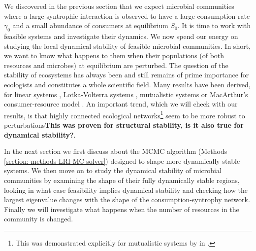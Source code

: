 \documentclass[12pt, titlepage]{report}
\begin{document}
We discovered in the previous section that we expect microbial communities where a large syntrophic interaction is observed to have a large consumption rate $\gamma_0$ and a small abundance of consumers at equilibrium $S_0$. It is time to work with feasible systems and investigate their dynamics. We now spend our energy on studying the local dynamical stability of feasible microbial communities. In short, we want to know what happens to them when their populations (of both resources and microbes) at equilibrium are perturbed. The question of the stability of ecosystems has always been and still remains of prime importance for ecologists and constitutes a whole scientific field. Many results have been derived, for linear systems \cite{may_will_1972}, Lotka-Volterra systems \cite{bunin_ecological_2017, takeuchi_global_1996}, mutualistic systems \cite{pascual-garcia_mutualism_2017} or MacArthur's consumer-resource model \cite{chesson_macarthurs_1990}. An important trend, which we will check with our results, is that highly connected ecological networks\footnote{This was demonstrated explicitly for mutualistic systems by \citeauthor{pascual-garcia_mutualism_2017} in \cite{pascual-garcia_mutualism_2017}.} seem to be more robust to perturbations\textbf{This was proven for structural stability, is it also true for dynamical stability?}.

In the next section we first discuss about the MCMC algorithm (Methods \ref{section: methods LRI MC solver}) designed to shape more dynamically stable systems. We then move on to study the dynamical stability of microbial communities by examining the shape of their fully dynamically stable regions, looking in what case feasibility implies dynamical stability and checking how the largest eigenvalue changes with the shape of the consumption-syntrophy network. Finally we will investigate what happens when the number of resources in the community is changed.
\end{document}
